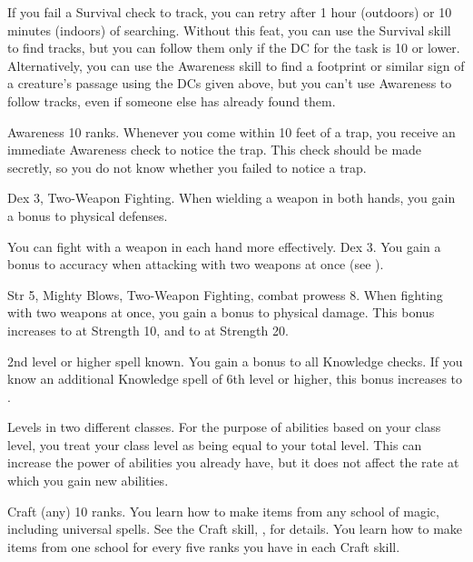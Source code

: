 If you fail a Survival check to track, you can retry after 1 hour (outdoors) or 10 minutes (indoors) of searching.
Without this feat, you can use the Survival skill to find tracks, but you can follow them only if the DC for the task is 10 or lower.
Alternatively, you can use the Awareness skill to find a footprint or similar sign of a creature's passage using the DCs given above, but you can't use Awareness to follow tracks, even if someone else has already found them.

\featpre Awareness 10 ranks.
\featben Whenever you come within 10 feet of a trap, you receive an immediate Awareness check to notice the trap.
This check should be made secretly, so you do not know whether you failed to notice a trap.

\featpres Dex 3, Two-Weapon Fighting.
\featben When wielding a weapon in both hands, you gain a  bonus to physical defenses.

You can fight with a weapon in each hand more effectively.
\featpre Dex 3.
\featben You gain a  bonus to accuracy when attacking with two weapons at once (see ).

\featpres Str 5, Mighty Blows, Two-Weapon Fighting, combat prowess 8.
\featben When fighting with two weapons at once, you gain a  bonus to physical damage.
This bonus increases to  at Strength 10, and to  at Strength 20.

\featpre 2nd level or higher  spell known.
\featben You gain a  bonus to all Knowledge checks.
If you know an additional Knowledge spell of 6th level or higher, this bonus increases to .

\featpre Levels in two different classes.
\featben For the purpose of abilities based on your class level, you treat your class level as being equal to your total level.
This can increase the power of abilities you already have, but it does not affect the rate at which you gain new abilities.

\featpre Craft (any) 10 ranks.
\featben You learn how to make items from any school of magic, including universal spells.
See the Craft skill, , for details.
You learn how to make items from one school for every five ranks you have in each Craft skill.

